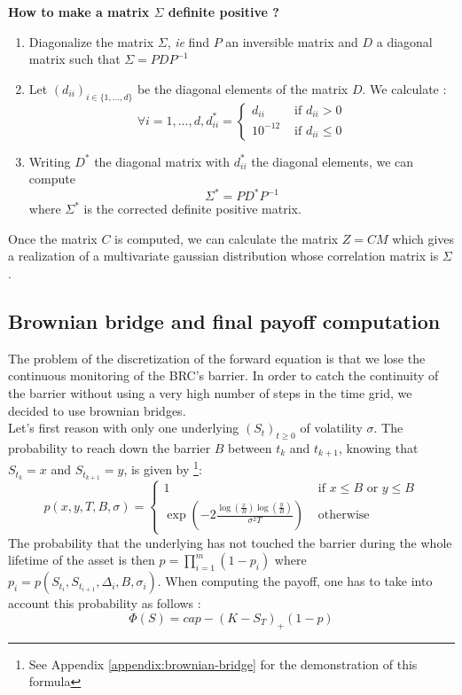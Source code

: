 \documentclass[a4paper,11pt,english]{book}
\begin{document}
\begin{tcolorbox}[breakable,colback=cyan,opacityfill=0.05,colframe=blue,width=\dimexpr\textwidth+12mm\relax,enlarge left by=-6mm]
\begin{center}
\vspace{0.2cm}
\textbf{How to make a matrix $\Sigma$ definite positive ?}
\end{center}
\begin{enumerate}
    \item Diagonalize the matrix $\Sigma$, \textit{ie} find $P$ an inversible matrix and $D$ a diagonal matrix such that $\Sigma=PDP^{-1}$
    \item Let $(d_{ii})_{i \in \{1,\ldots,d\}}$ be the diagonal elements of the matrix $D$. We calculate : $$\forall i=1,\ldots,d, d_{ii}^{*}=\begin{cases}
        d_{ii}& \text{ if } d_{ii}>0 \\
        10^{-12}& \text{ if } d_{ii}\leq0
    \end{cases}$$
 \item Writing $D^{*}$ the diagonal matrix with $d_{ii}^{*}$ the diagonal elements, we can compute $$\Sigma^{*}=PD^{*}P^{-1}$$ where $\Sigma^{*}$ is the corrected definite positive matrix.
\end{enumerate}
\end{tcolorbox}
Once the matrix $C$ is computed, we can calculate the matrix $Z=CM$ which gives a realization of a multivariate gaussian distribution whose correlation matrix is $\Sigma$.
\subsection{Brownian bridge and final payoff computation}
\label{subsec:brownian-bridge}
The problem of the discretization of the forward equation is that we lose the continuous monitoring of the BRC's barrier. In order to catch the continuity of the barrier without using a very high number of steps in the time grid, we decided to use brownian bridges.\\

Let's first reason with only one underlying $(S_{t})_{t\geq0}$ of volatility $\sigma$. The probability to reach down the barrier $B$ between $t_{k}$ and $t_{k+1}$, knowing that $S_{t_{k}}=x$ and $S_{t_{k+1}}=y$, is given by \footnote{See Appendix \ref{appendix:brownian-bridge} for the demonstration of this formula}:
$$p(x,y,T,B,\sigma) = 
\begin{cases}
1 &\text{ if } x\leq B \text{ or } y\leq B \\
\exp(-2\frac{\log(\frac{x}{B})\log(\frac{y}{B})}{\sigma^{2}T}) &\text{ otherwise }
\end{cases}$$
The probability that the underlying has not touched the barrier during the whole lifetime of the asset is then $p=\prod_{i=1}^{m}(1-p_{i})$ where $p_{i}=p(S_{t_{i}},S_{t_{i+1}},\Delta_{i},B,\sigma_{i})$. When computing the payoff, one has to take into account this probability as follows :
$$\Phi(S) = cap -(K-S_{T})_{+}(1-p)$$
\end{document}
